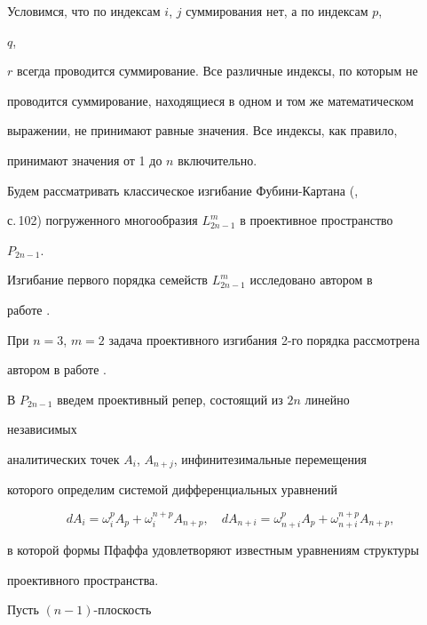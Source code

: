  




 


Условимся, что по индексам $i$, $j$ суммирования нет, а по индексам $p$, 


$q$, 


$r$ всегда проводится суммирование. Все различные индексы, по которым не 


проводится суммирование, находящиеся в одном и том же математическом 


выражении, не принимают равные значения. Все индексы, как правило, 


принимают значения от 1 до $n$ включительно. 


 


Будем рассматривать классическое изгибание Фубини-Картана (\cite{Fin}, 


с.\,102) погруженного многообразия $L^m_{2n-1}$ в проективное пространство 


$P_{2n-1}$. 


 


Изгибание первого порядка семейств $L^m_{2n-1}$ исследовано автором в 


работе \cite{Z1}. 


При $n=3$, $m=2$ задача проективного изгибания 2-го порядка рассмотрена 


автором в работе \cite{Z2}. 


 


В $P_{2n-1}$ введем проективный репер, состоящий из $2n$ линейно 


независимых 


аналитических точек $A_i$, $A_{n+j}$, инфинитезимальные перемещения 


которого определим системой дифференциальных уравнений 


$$ 


dA_i=\omega^p_iA_p+\omega^{n+p}_iA_{n+p},\quad 


dA_{n+i}=\omega^p_{n+i}A_p+\omega^{n+p}_{n+i}A_{n+p}, 


$$ 


в которой формы Пфаффа удовлетворяют известным уравнениям структуры 


проективного пространства. 


 


Пусть $(n-1)$-плоскость 



